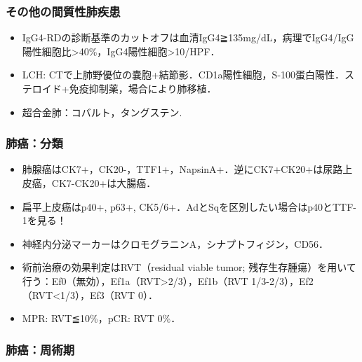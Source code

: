 \subsubsection{その他の間質性肺疾患}

\begin{itemize}
\item IgG4-RDの診断基準のカットオフは血清IgG4≧135mg/dL，病理でIgG4/IgG陽性細胞比>40\%，IgG4陽性細胞>10/HPF．
\item LCH: CTで上肺野優位の嚢胞+結節影．CD1a陽性細胞，S-100蛋白陽性．ステロイド+免疫抑制薬，場合により肺移植．
\item 超合金肺：コバルト，タングステン.
\end{itemize}


\subsubsection{肺癌：分類}

\begin{itemize}
\item 肺腺癌はCK7+，CK20-，TTF1+，NapsinA+．逆にCK7+CK20+は尿路上皮癌，CK7-CK20+は大腸癌．
\item 扁平上皮癌はp40+, p63+, CK5/6+．AdとSqを区別したい場合はp40とTTF-1を見る！
\item 神経内分泌マーカーはクロモグラニンA，シナプトフィジン，CD56．
\item 術前治療の効果判定はRVT（residual viable tumor; 残存生存腫瘍）を用いて行う：Ef0（無効），Ef1a（RVT>2/3），Ef1b（RVT 1/3-2/3），Ef2（RVT<1/3），Ef3（RVT 0）．
\item MPR: RVT≦10\%，pCR: RVT 0\%．


\end{itemize}


\subsubsection{肺癌：周術期}

